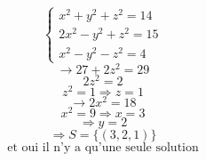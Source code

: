 \documentclass{article}
\begin{document}
\[
\begin{cases}
x^2 + y^2 + z^2 = 14 \\
2x^2 - y^2 + z^2 = 15 \\
x^2 - y^2 - z^2 = 4
\end{cases}
\]
\[ \rightarrow 27 + 2z^2 = 29 \]
\[ 2z^2 = 2 \]
\[ z^2 = 1 \Rightarrow z = 1 \]
\[ \rightarrow 2x^2 = 18 \]
\[ x^2 = 9 \Rightarrow x = 3 \]
\[ \Rightarrow y = 2 \]
\[ \Rightarrow S = \{(3, 2, 1)\} \]
\[ \text{et oui il n'y a qu'une seule solution} \]
\end{document}
